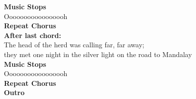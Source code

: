 \textbf{Music Stops}\\
Ooooooooooooooooh\\
\textbf{Repeat Chorus}\\
\textbf{After last chord:} \\
The head of the herd was calling far, far away;\\
they met one night in the silver light on the road to Mandalay\\
\textbf{Music Stops}\\
Ooooooooooooooooh\\
\textbf{Repeat Chorus}\\
\textbf{Outro}\\
      \\
       \\


